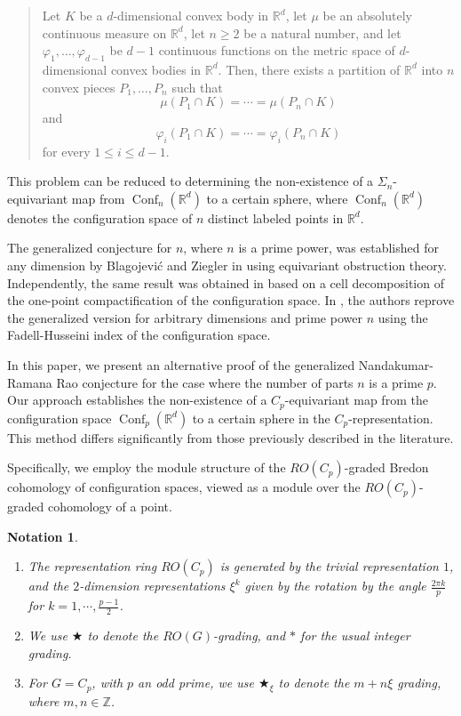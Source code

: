 \documentclass[a4paper,leqno,11pt]{amsart}
\renewcommand{\phi}{\varphi}
\newcommand{\Conf}{\operatorname{Conf}}
\newcommand{\bs}{\bigstar}
\newcommand{\bsc}{\bs_\xi}
\theoremstyle{plain}
\newtheorem{notation}[theorem]{Notation}
\theoremstyle{definition}
\theoremstyle{remark}
\begin{document}
\begin{quote}
    Let \(K\) be a \(d\)-dimensional convex body in \(\mathbb{R}^d\), let \(\mu\) be an absolutely continuous measure on \(\mathbb{R}^d\), let \(n \geq 2\) be a natural number, and let \(\phi_1, \ldots, \phi_{d-1}\) be \(d-1\) continuous functions on the metric space of \(d\)-dimensional convex bodies in \(\mathbb{R}^d\). Then, there exists a partition of \(\mathbb{R}^d\) into \(n\) convex pieces \(P_1, \ldots, P_n\) such that  
    \[
    \mu(P_1 \cap K) = \cdots = \mu(P_n \cap K)
    \]
    and 
    \[
    \phi_i(P_1 \cap K) = \cdots = \phi_i(P_n \cap K)
    \]
    for every \(1 \leq i \leq d-1\).
\end{quote}

This problem can be reduced to determining the non-existence of a \(\Sigma_n\)-equivariant map from \(\Conf_{n}(\mathbb{R}^d)\) to a certain sphere, where \(\Conf_{n}(\mathbb{R}^d)\) denotes the configuration space of \(n\) distinct labeled points in \(\mathbb{R}^d\).


The generalized conjecture for \(n\), where \(n\) is a prime power, was established for any dimension by Blagojević and Ziegler in \cite{BZ14} using equivariant obstruction theory. Independently, the same result was obtained in \cite{KHA14} based on a cell decomposition of the one-point compactification of the configuration space.
In \cite{BLZ}, the authors reprove the generalized version for arbitrary dimensions and prime power \(n\) using the Fadell-Husseini index of the configuration space.



In this paper, we present an alternative proof of the generalized Nandakumar-Ramana Rao conjecture for the case where the number of parts \( n \) is a prime \( p \). Our approach establishes the non-existence of a \( C_p \)-equivariant map from the configuration space \( \Conf_{p}(\mathbb{R}^d) \) to a certain sphere in the \( C_p \)-representation. This method differs significantly from those previously described in the literature.


Specifically, we employ the module structure of the \( RO(C_p) \)-graded Bredon cohomology of configuration spaces, viewed as a module over the \( RO(C_p) \)-graded cohomology of a point. 

\begin{notation}
   \begin{enumerate}
       \item  The representation ring $RO(C_p)$ is generated by the trivial representation $1$, and the $2$-dimension representations $\xi^k$ given by the rotation by the angle $\frac{2\pi k}{p}$ for $k=1, \cdots, \frac{p-1}{2}$. 
\item We use \( \bs \) to denote the \( RO(G) \)-grading, and \( * \) for the usual integer grading.

    \item For \( G = C_p \), with \( p \) an odd prime, we use \( \bsc \) to denote the \( m + n\xi \) grading, where \( m, n \in \mathbb{Z} \).
\end{enumerate}
\end{notation}
\end{document}
